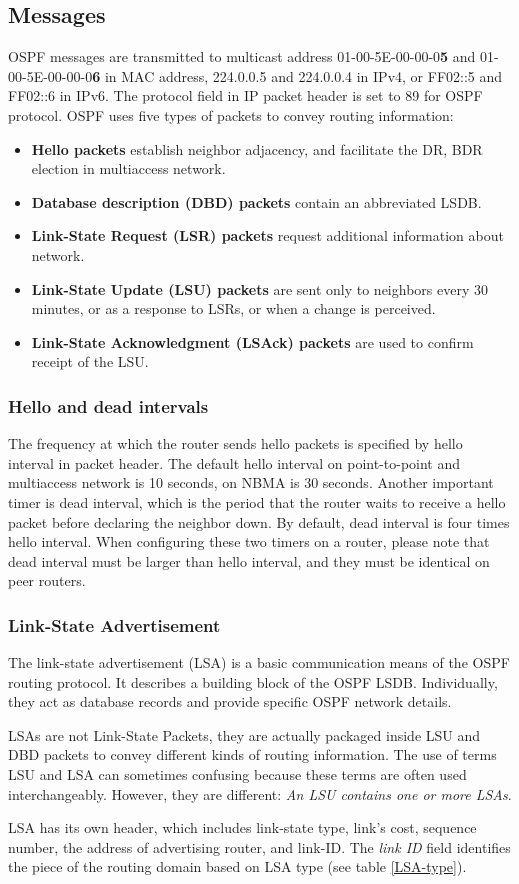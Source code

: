 \subsection{Messages}
OSPF messages are transmitted to multicast address 01-00-5E-00-00-0\textbf{5} and 01-00-5E-00-00-0\textbf{6} in MAC address, 224.0.0.5 and 224.0.0.4 in IPv4, or FF02::5 and FF02::6 in IPv6. The protocol field in IP packet header is set to 89 for OSPF protocol.
OSPF uses five types of packets to convey routing information:
\begin{itemize}
	\item \textbf{Hello packets} establish neighbor adjacency, and facilitate the DR, BDR election in multiaccess network.
	\item \textbf{Database description (DBD) packets} contain an abbreviated LSDB.
	\item \textbf{Link-State Request (LSR) packets} request additional information about network.
	\item \textbf{Link-State Update (LSU) packets} are sent only to neighbors every 30 minutes, or as a response to LSRs, or when a change is perceived.
	\item \textbf{Link-State Acknowledgment (LSAck) packets} are used to confirm receipt of the LSU.
\end{itemize}
\subsubsection{Hello and dead intervals}
The frequency at which the router sends hello packets is specified by hello interval in packet header. The default hello interval on point-to-point and multiaccess network is 10 seconds, on NBMA is 30 seconds. Another important timer is dead interval, which is the period that the router waits to receive a hello packet before declaring the neighbor down. By default, dead interval is four times hello interval. When configuring these two timers on a router, please note that dead interval must be larger than hello interval, and they must be identical on peer routers.
\subsubsection{Link-State Advertisement}
The link-state advertisement (LSA) is a basic communication means of the OSPF routing protocol. It describes a building block of the OSPF LSDB. Individually, they act as database records and provide specific OSPF network details.\par 
LSAs are not Link-State Packets, they are actually packaged inside LSU and DBD packets to convey different kinds of routing information. The use of terms LSU and LSA can sometimes confusing because these terms are often used interchangeably. However, they are different: \emph{An LSU contains one or more LSAs}.\par 
LSA has its own header, which includes link-state type, link's cost, sequence number, the address of advertising router, and link-ID. The \emph{link ID} field identifies the piece of the routing domain based on LSA type (see table \ref{LSA-type}).

